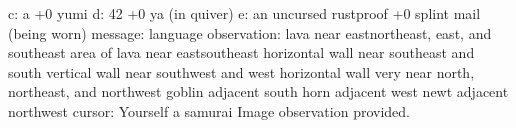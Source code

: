 {c: a +0 yumi\newline
d: 42 +0 ya (in quiver)\newline
e: an uncursed rustproof +0 splint mail (being worn)\newline
\newline
message:\newline
\newline
language observation:\newline
lava near eastnortheast, east, and southeast\newline
area of lava near eastsoutheast\newline
horizontal wall near southeast and south\newline
vertical wall near southwest and west\newline
horizontal wall very near north, northeast, and northwest\newline
goblin adjacent south\newline
horn adjacent west\newline
newt adjacent northwest\newline\newline
cursor:\newline
Yourself a samurai
\newline\newline
Image observation provided.
}


